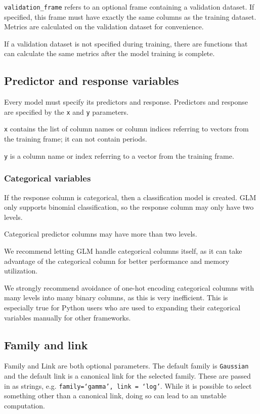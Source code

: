 \texttt{validation\_frame} refers to an optional frame containing a validation dataset.  If specified, this 
frame must have exactly the same columns as the training dataset.  Metrics are calculated on the validation dataset
for convenience.

If a validation dataset is not specified during training, there are functions that can calculate the same metrics after the model training is complete. %

\subsection{Predictor and response variables}

Every model must specify its predictors and response.  Predictors and response are specified by the \texttt{x}
and \texttt{y} parameters.

\texttt{x} contains the list of column names or column indices referring to vectors from the training frame; it can
not contain periods.

\texttt{y} is a column name or index referring to a vector from the training frame.

\subsubsection{Categorical variables}

If the response column is categorical, then a classification model is created.  GLM only supports binomial
classification, so the response column may only have two levels.

Categorical predictor columns may have more than two levels.

We recommend letting GLM handle categorical columns itself, as it can take advantage of the categorical
column for better performance and memory utilization.

We strongly recommend avoidance of one-hot encoding categorical columns with many levels into many binary columns, as this is very inefficient.  This is especially true for Python users who are used to expanding their categorical variables
manually for other frameworks.

\subsection{Family and link}

Family and Link are both optional parameters. The default family is \texttt{Gaussian} and the default link is a
canonical link for the selected family. These are passed in as strings, e.g. \texttt{family=`gamma', link = `log'}.
While it is possible to select something other than a canonical link, doing so can lead to an unstable
computation. 

